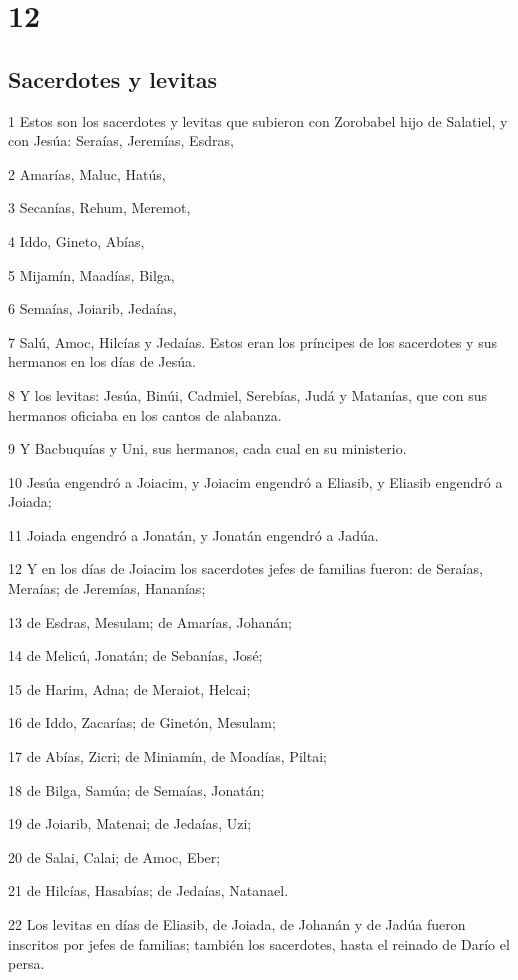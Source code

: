 \chapter{12}

\section*{Sacerdotes y levitas}

\par 1 Estos son los sacerdotes y levitas que subieron con Zorobabel hijo de Salatiel, y con Jesúa: Seraías, Jeremías, Esdras,
\par 2 Amarías, Maluc, Hatús,
\par 3 Secanías, Rehum, Meremot, 
\par 4 Iddo, Gineto, Abías,
\par 5 Mijamín, Maadías, Bilga,
\par 6 Semaías, Joiarib, Jedaías,
\par 7 Salú, Amoc, Hilcías y Jedaías. Estos eran los príncipes de los sacerdotes y sus hermanos en los días de Jesúa.
\par 8 Y los levitas: Jesúa, Binúi, Cadmiel, Serebías, Judá y Matanías, que con sus hermanos oficiaba en los cantos de alabanza.
\par 9 Y Bacbuquías y Uni, sus hermanos, cada cual en su ministerio.
\par 10 Jesúa engendró a Joiacim, y Joiacim engendró a Eliasib, y Eliasib engendró a Joiada;
\par 11 Joiada engendró a Jonatán, y Jonatán engendró a Jadúa.
\par 12 Y en los días de Joiacim los sacerdotes jefes de familias fueron: de Seraías, Meraías; de Jeremías, Hananías;
\par 13 de Esdras, Mesulam; de Amarías, Johanán;
\par 14 de Melicú, Jonatán; de Sebanías, José;
\par 15 de Harim, Adna; de Meraiot, Helcai;
\par 16 de Iddo, Zacarías; de Ginetón, Mesulam;
\par 17 de Abías, Zicri; de Miniamín, de Moadías, Piltai;
\par 18 de Bilga, Samúa; de Semaías, Jonatán;
\par 19 de Joiarib, Matenai; de Jedaías, Uzi;
\par 20 de Salai, Calai; de Amoc, Eber;
\par 21 de Hilcías, Hasabías; de Jedaías, Natanael.
\par 22 Los levitas en días de Eliasib, de Joiada, de Johanán y de Jadúa fueron inscritos por jefes de familias; también los sacerdotes, hasta el reinado de Darío el persa.
